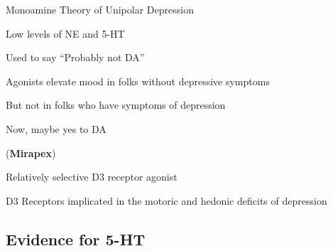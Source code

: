 \begin{coloredlist}
    \item Monoamine Theory of Unipolar Depression
    \begin{coloredlist}
        \item Low levels of NE and 5-HT
        \begin{coloredlist}
            \item Used to say ``Probably not DA''
            \begin{coloredlist}
                \item Agonists elevate mood in folks without depressive symptoms
                \item But not in folks who have symptoms of depression
                \item Now, maybe yes to DA
                \begin{coloredlist}
                    \item {} (\textbf{Mirapex}) 
                    \begin{coloredlist}
                        \item Relatively selective D3 receptor agonist
                        \item D3 Receptors implicated in the motoric and hedonic deficits of depression 
                    \end{coloredlist}
                \end{coloredlist}
            \end{coloredlist}
        \end{coloredlist}
    \end{coloredlist}
\end{coloredlist}

\subsection{Evidence for 5-HT}

